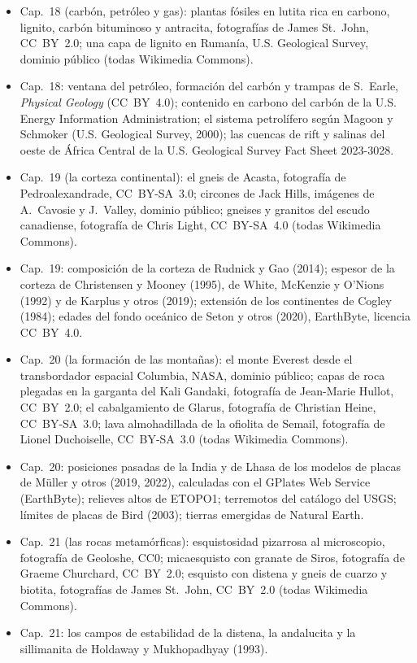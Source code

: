 \begin{itemize}
  \item Cap.~18 (carbón, petróleo y gas): plantas fósiles en lutita rica en carbono, lignito, carbón bituminoso y antracita, fotografías de James St.~John, CC~BY~2.0; una capa de lignito en Rumanía, U.S. Geological Survey, dominio público (todas Wikimedia Commons).
  \item Cap.~18: ventana del petróleo, formación del carbón y trampas de S.~Earle, \emph{Physical Geology} (CC~BY~4.0); contenido en carbono del carbón de la U.S. Energy Information Administration; el sistema petrolífero según Magoon y Schmoker (U.S. Geological Survey, 2000); las cuencas de rift y salinas del oeste de África Central de la U.S. Geological Survey Fact Sheet 2023-3028.
  \item Cap.~19 (la corteza continental): el gneis de Acasta, fotografía de Pedroalexandrade, CC~BY-SA~3.0; circones de Jack Hills, imágenes de A.~Cavosie y J.~Valley, dominio público; gneises y granitos del escudo canadiense, fotografía de Chris Light, CC~BY-SA~4.0 (todas Wikimedia Commons).
  \item Cap.~19: composición de la corteza de Rudnick y Gao (2014); espesor de la corteza de Christensen y Mooney (1995), de White, McKenzie y O'Nions (1992) y de Karplus y otros (2019); extensión de los continentes de Cogley (1984); edades del fondo oceánico de Seton y otros (2020), EarthByte, licencia CC~BY~4.0.
  \item Cap.~20 (la formación de las montañas): el monte Everest desde el transbordador espacial Columbia, NASA, dominio público; capas de roca plegadas en la garganta del Kali Gandaki, fotografía de Jean-Marie Hullot, CC~BY~2.0; el cabalgamiento de Glarus, fotografía de Christian Heine, CC~BY-SA~3.0; lava almohadillada de la ofiolita de Semail, fotografía de Lionel Duchoiselle, CC~BY-SA~3.0 (todas Wikimedia Commons).
  \item Cap.~20: posiciones pasadas de la India y de Lhasa de los modelos de placas de Müller y otros (2019, 2022), calculadas con el GPlates Web Service (EarthByte); relieves altos de ETOPO1; terremotos del catálogo del USGS; límites de placas de Bird (2003); tierras emergidas de Natural Earth.
  \item Cap.~21 (las rocas metamórficas): esquistosidad pizarrosa al microscopio, fotografía de Geoloshe, CC0; micaesquisto con granate de Siros, fotografía de Graeme Churchard, CC~BY~2.0; esquisto con distena y gneis de cuarzo y biotita, fotografías de James St.~John, CC~BY~2.0 (todas Wikimedia Commons).
  \item Cap.~21: los campos de estabilidad de la distena, la andalucita y la sillimanita de Holdaway y Mukhopadhyay (1993).

\end{itemize}
